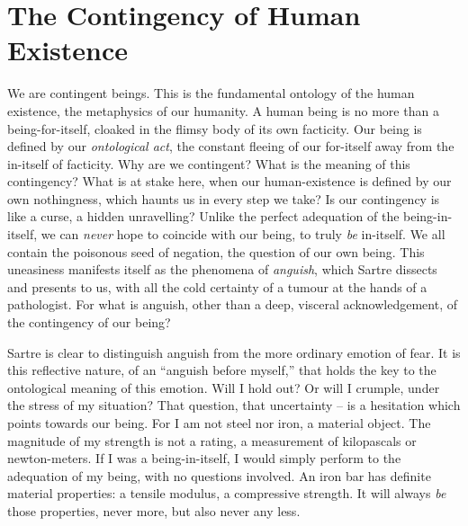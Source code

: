 \chapter{The Contingency of Human Existence}


We are contingent beings. This is the fundamental ontology of the human existence, the metaphysics of our humanity. A human being is no more than a being-for-itself, cloaked in the flimsy body of its own facticity. Our being is defined by our \emph{ontological act}, the constant fleeing of our for-itself away from the in-itself of facticity. Why are we contingent? What is the meaning of this contingency? What is at stake here, when our human-existence is defined by our own nothingness, which haunts us in every step we take? Is our contingency is like a curse, a hidden unravelling? Unlike the perfect adequation of the being-in-itself, we can \emph{never} hope to coincide with our being, to truly \emph{be} in-itself. We all contain the poisonous seed of negation, the question of our own being. This uneasiness manifests itself as the phenomena of \emph{anguish}, which Sartre dissects and presents to us, with all the cold certainty of a tumour at the hands of a pathologist. For what is anguish, other than a deep, visceral acknowledgement, of the contingency of our being?


Sartre is clear to distinguish anguish from the more ordinary emotion of fear.  It is this reflective nature, of an \enquote{anguish before myself,} that holds the key to the ontological meaning of this emotion.
Will I hold out? Or will I crumple, under the stress of my situation?
That question, that uncertainty -- is a hesitation which points towards our being. For I am not steel nor iron, a material object.
The magnitude of my strength is not a rating, a measurement of kilopascals or newton-meters. If I was a being-in-itself, I would simply perform to the adequation of my being, with no questions involved. An iron bar has definite material properties: a tensile modulus, a compressive strength. It will always \emph{be} those properties, never more, but also never any less.

